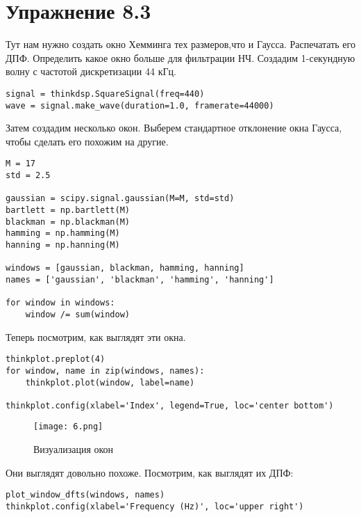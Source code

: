 \documentclass[a4paper,12pt]{report}
\begin{document}
\chapter{Упражнение 8.3}
Тут нам нужно создать окно Хемминга тех размеров,что и Гаусса. Распечатать его ДПФ. Определить какое окно больше для фильтрации НЧ.
Создадим 1-секундную волну с частотой дискретизации 44 кГц.

\begin{lstlisting}[caption=Создание сигнала]
signal = thinkdsp.SquareSignal(freq=440)
wave = signal.make_wave(duration=1.0, framerate=44000)
\end{lstlisting}

Затем создадим несколько окон. Выберем стандартное отклонение окна Гаусса, чтобы сделать его похожим на другие.

\begin{lstlisting}[caption=Создание различных окон]
M = 17
std = 2.5

gaussian = scipy.signal.gaussian(M=M, std=std)   
bartlett = np.bartlett(M)
blackman = np.blackman(M)
hamming = np.hamming(M)
hanning = np.hanning(M)

windows = [gaussian, blackman, hamming, hanning]
names = ['gaussian', 'blackman', 'hamming', 'hanning']

for window in windows:
    window /= sum(window)
\end{lstlisting}

Теперь посмотрим, как выглядят эти окна.

\begin{lstlisting}[caption=Визуализация окон]
thinkplot.preplot(4)
for window, name in zip(windows, names):
    thinkplot.plot(window, label=name)

thinkplot.config(xlabel='Index', legend=True, loc='center bottom')
\end{lstlisting}

\begin{figure}[H]
        \centering
        \texttt{[image: 6.png]}
        \caption{Визуализация окон}
        \label{fig:lab8_fig3_1}
\end{figure}

Они выглядят довольно похоже. Посмотрим, как выглядят их ДПФ:


\begin{lstlisting}[caption=Визуализация ДПФ]
plot_window_dfts(windows, names)
thinkplot.config(xlabel='Frequency (Hz)', loc='upper right')
\end{lstlisting}
\end{document}
